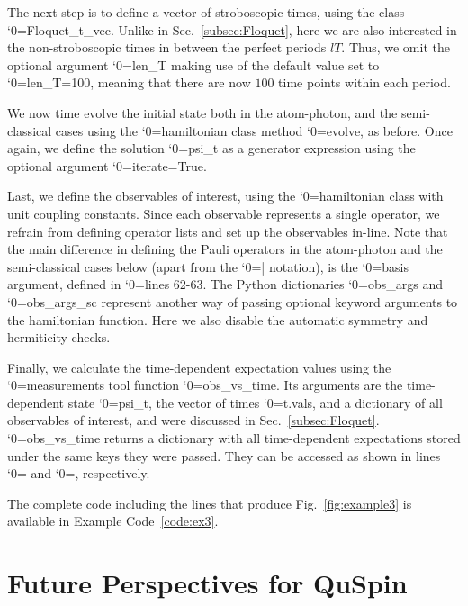 \documentclass{SciPost}
\newcommand\0{\scalebox{-1}[1]{0}}
\let\svttfamily\ttfamily
\renewcommand\ttfamily{\svttfamily\catcode`0=\active }
\renewcommand\texttt{\bgroup\ttfamily\texttthelp}
\def\texttthelp#1{#1\egroup}
\begin{document}
% 

The next step is to define a vector of stroboscopic times, using the class \texttt{Floquet\_t\_vec}. Unlike in Sec.~\ref{subsec:Floquet}, here we are also interested in the non-stroboscopic times in between the perfect periods $lT$. Thus, we omit the optional argument \texttt{len\_T} making use of the default value set to \texttt{len\_T=100}, meaning that there are now $100$ time points within each period.
% 

We now time evolve the initial state both in the atom-photon, and the semi-classical cases using the \texttt{hamiltonian} class method \texttt{evolve}, as before. Once again, we define the solution \texttt{psi\_t} as a generator expression using the optional argument \texttt{iterate=True}.
%

Last, we define the observables of interest, using the \texttt{hamiltonian} class with unit coupling constants. Since each observable represents a single operator, we refrain from defining operator lists and set up the observables in-line. Note that the main difference in defining the Pauli operators in the atom-photon and the semi-classical cases below (apart from the \texttt{|} notation), is the \texttt{basis} argument, defined in \texttt{lines 62-63}. The Python dictionaries \texttt{obs\_args} and \texttt{obs\_args\_sc} represent another way of passing optional keyword arguments to the hamiltonian function. Here we also disable the automatic symmetry and hermiticity checks.
% 

Finally, we calculate the time-dependent expectation values using the \texttt{measurements} tool function \texttt{obs\_vs\_time}. Its arguments are the time-dependent state \texttt{psi\_t}, the vector of times \texttt{t.vals}, and a dictionary of all observables of interest, and were discussed in Sec.~\ref{subsec:Floquet}. \texttt{obs\_vs\_time} returns a dictionary with all time-dependent expectations stored under the same keys they were passed. They can be accessed as shown in lines \texttt{75} and \texttt{78}, respectively. 

%
The complete code including the lines that produce Fig.~\ref{fig:example3} is available in Example Code~\ref{code:ex3}.

\section{Future Perspectives for QuSpin}
\label{sec:outro}
\end{document}
